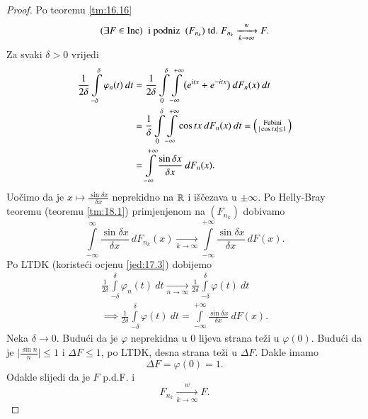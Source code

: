 \begin{proof}
    Po teoremu \ref{tm:16.16}
    \begin{equation*}
        (\exists F \in \mathrm{Inc}) \; \textnormal{ i podniz } \; (F_{n_k}) \; \mathrm{td.} \; F_{n_k} \xrightarrow[k \to \infty]{w} F.
    \end{equation*}
    Za svaki $\delta > 0$ vrijedi
    \begin{equation*}
        \begin{aligned}
            \frac{1}{2 \delta} \int\limits_{-\delta}^\delta  \varphi_n (t) \: d t &= \frac{1}{2 \delta} \int\limits_0^\delta \int\limits_{-\infty}^{+\infty} \big( e^{itx} + e^{-itx} \big) \: d F_n (x) \: d t\\
            &= \frac{1}{\delta} \int\limits_0^\delta \int\limits_{-\infty}^{+\infty} \cos tx \: d F_n (x) \: dt =
            \begin{psmallmatrix}
                \textnormal{Fubini}\\
                |\cos tx| \leq 1
            \end{psmallmatrix}\\
            &= \int\limits_{-\infty}^{+\infty} \frac{\sin \delta x}{\delta x} \: d F_n (x).
        \end{aligned}
    \end{equation*}
    Uo\v cimo da je $x \mapsto \frac{\sin \delta x}{\delta x}$ neprekidno na $\mathbb{R}$ i i\v s\v cezava u $\pm \infty$.
    Po Helly-Bray teoremu (teoremu \ref{tm:18.1}) primjenjenom na $(F_{n_k})$ dobivamo
    \begin{equation*}
        \int\limits_{-\infty}^{\infty} \frac{\sin \delta x}{\delta x} \: d F_{n_k} (x) \xrightarrow[k \to \infty]{} \int\limits_{-\infty}^{+\infty} \frac{\sin \delta x}{\delta x} \: d F (x).
    \end{equation*}
    Po LTDK (koriste\' ci ocjenu \eqref{jed:17.3}) dobijemo
    \begin{equation*}
        \begin{gathered}
            \frac{1}{2 \delta} \int\limits_{-\delta}^\delta \varphi_n (t) \: d t \xrightarrow[n \to \infty]{} \frac{1}{2 \delta} \int\limits_{-\delta}^{\delta} \varphi (t) \: d t\\
            \implies \frac{1}{2 \delta} \int\limits_{-\delta}^{\delta} \varphi (t) \: dt = \int\limits_{-\infty}^{+\infty} \frac{\sin \delta x}{\delta x} \: d F (x).
        \end{gathered}
    \end{equation*}
    Neka $\delta \to 0$.
    Budu\' ci da je $\varphi$ neprekidna u $0$ lijeva strana te\v zi u $\varphi (0)$.
    Budu\' ci da je $\Big| \frac{\sin n}{n} \Big| \leq 1$ i $\Delta F \leq 1$, po LTDK, desna strana te\v zi u $\Delta F$.
    Dakle imamo
    \begin{equation*}
        \Delta F = \varphi (0) = 1.
    \end{equation*}
    Odakle slijedi da je $F$ p.d.F. i
    \begin{equation*}
        F_{n_k} \xrightarrow[k \to \infty]{w} F.
    \end{equation*}
    

\end{proof}

